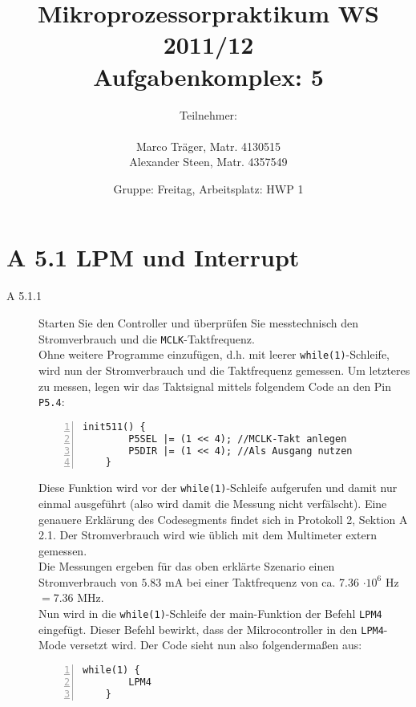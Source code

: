 \documentclass[11pt,a4paper,ngerman]{article}
\author{Teilnehmer:\\ \\Marco Träger, Matr. 4130515\\Alexander Steen, Matr. 4357549}
\date{Gruppe: Freitag, Arbeitsplatz: HWP 1}
\title{Mikroprozessorpraktikum WS 2011/12\\ Aufgabenkomplex: 5}
\begin{document}

\maketitle
\thispagestyle{fancy}
\newpage
\section*{A 5.1 LPM und Interrupt}

\begin{description}
	\item[A 5.1.1] Starten Sie den Controller und überprüfen Sie messtechnisch den Stromverbrauch und die \texttt{MCLK}-Taktfrequenz. \\
	
	Ohne weitere Programme einzufügen, d.h. mit leerer \texttt{while(1)}-Schleife, wird nun der Stromverbrauch und die Taktfrequenz gemessen. Um letzteres zu messen, legen wir das Taktsignal mittels folgendem Code an den Pin \texttt{P5.4}:
	
	\begin{lstlisting}[numbers=left]
	init511() {
		P5SEL |= (1 << 4); //MCLK-Takt anlegen
		P5DIR |= (1 << 4); //Als Ausgang nutzen
	}
	\end{lstlisting}
	
	Diese Funktion wird vor der \texttt{while(1)}-Schleife aufgerufen und damit nur einmal ausgeführt (also wird damit die Messung nicht verfälscht). Eine genauere Erklärung des Codesegments findet sich in Protokoll 2, Sektion A 2.1. Der Stromverbrauch wird wie üblich mit dem Multimeter extern gemessen.\\
	Die Messungen ergeben für das oben erklärte Szenario einen Stromverbrauch von $5.83$ mA bei einer Taktfrequenz von ca. 7.36 $\cdot 10^6$ Hz $= 7.36$ MHz. \\
	
	Nun wird in die \texttt{while(1)}-Schleife der main-Funktion der Befehl \texttt{LPM4} eingefügt. Dieser Befehl bewirkt, dass der Mikrocontroller in den \texttt{LPM4}-Mode versetzt wird. Der Code sieht nun also folgendermaßen aus:
	
	\begin{lstlisting}[numbers=left]
	while(1) {
		LPM4
	}
	\end{lstlisting}
	

\end{description}
\end{document}
